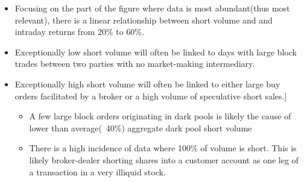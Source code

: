 \documentclass[12pt, oneside]{article}
\begin{document}
\begin{itemize}
    \item Focusing on the part of the figure where data is most abundant(thus most relevant), there is a linear relationship between short volume and and intraday returns from 20\% to 60\%.
    \item Exceptionally low short volume will often be linked to days with large block trades between two parties with no market-making intermediary. 
    \item Exceptionally high short volume will often be linked to either large buy orders facilitated by a broker or a high volume of speculative short sales.]
    \begin{itemize}
        \item A few large block orders originating in dark pools is likely the cause of lower than average(~40\%) aggregate dark pool short volume
    \end{itemize}
    \begin{itemize}
        \item There is a high incidence of data where 100\% of volume is short. This is likely broker-dealer shorting shares into a customer account as one leg of a transaction in a very illiquid stock.
    \end{itemize}
\end{itemize}
\end{document}
